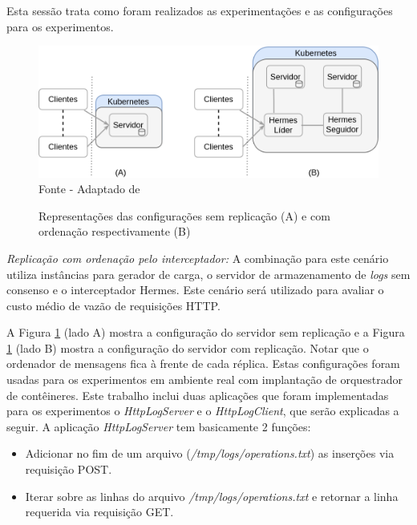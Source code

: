Esta sessão trata como foram realizados as experimentações e as configurações para os experimentos.

\begin{figure}[htb!]
\centering
\caption{Representações das configurações sem replicação (A) e com ordenação respectivamente (B)}
\includegraphics[width=\linewidth]{figures/confiuracoes-kubernetes.drawio.png}
{\flushleft Fonte - Adaptado de \textcite{renan2021hermes}}
\label{fig:arquitetura-cluster-ordenadores}
\end{figure}

\textit{Replicação com ordenação pelo interceptador:} A combinação para este cenário utiliza instâncias para gerador de carga, o servidor de armazenamento de \textit{logs}
sem consenso e o interceptador Hermes. Este cenário será utilizado para avaliar o custo médio de vazão de requisições HTTP.

\pagebreak

A Figura \ref{fig:arquitetura-cluster-ordenadores} (lado A) mostra a configuração do servidor sem replicação e a Figura \ref{fig:arquitetura-cluster-ordenadores} (lado B) mostra a configuração do servidor com replicação. Notar que o ordenador de mensagens fica à frente de cada réplica. Estas configurações foram usadas para os experimentos em ambiente real com implantação de orquestrador de contêineres. Este trabalho inclui duas aplicações que foram implementadas para os experimentos o \textit{HttpLogServer} e o \textit{HttpLogClient}, que serão explicadas a seguir. A aplicação \textit{HttpLogServer} tem basicamente 2 funções:

\begin{itemize}
\item Adicionar no fim de um arquivo (\textit{/tmp/logs/operations.txt}) as inserções via requisição POST.
\item Iterar sobre as linhas do arquivo \textit{/tmp/logs/operations.txt} e retornar a linha requerida via requisição GET.
\end{itemize}

